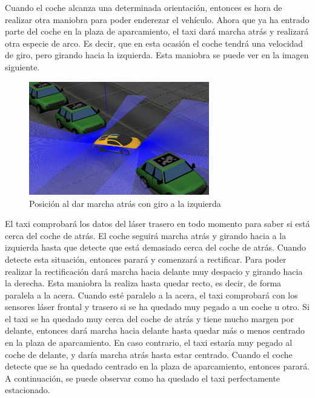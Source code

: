 Cuando el coche alcanza una determinada orientación, entonces es hora de realizar otra maniobra para poder enderezar el vehículo. Ahora que ya ha entrado parte del coche en la plaza de aparcamiento, el taxi dará marcha atrás y realizará otra especie de arco. Es decir, que en esta ocasión el coche tendrá una velocidad de giro, pero girando hacia la izquierda. Esta maniobra se puede ver en la imagen siguiente.\\

\begin{figure}[H]
  \begin{center}
    \includegraphics[width=0.7\textwidth]{figures/Autopark/Posicion4.png}
		\caption{Posición al dar marcha atrás con giro a la izquierda}
		\label{fig.Posicion4}
		\end{center}
\end{figure}

El taxi comprobará los datos del láser trasero en todo momento para saber si está cerca del coche de atrás. El coche seguirá marcha atrás y girando hacia a la izquierda hasta que detecte que está demasiado cerca del coche de atrás. Cuando detecte esta situación, entonces parará y comenzará a rectificar. Para poder realizar la rectificación dará marcha hacia delante muy despacio y girando hacia la derecha. Esta maniobra la realiza hasta quedar recto, es decir, de forma paralela a la acera. Cuando esté paralelo a la acera, el taxi comprobará con los sensores láser frontal y trasero si se ha quedado muy pegado a un coche u otro. Si el taxi se ha quedado muy cerca del coche de atrás y tiene mucho margen por delante, entonces dará marcha hacia delante hasta quedar más o menos centrado en la plaza de aparcamiento. En caso contrario, el taxi estaría muy pegado al coche de delante, y daría marcha atrás hasta estar centrado. Cuando el coche detecte que se ha quedado centrado en la plaza de aparcamiento, entonces parará. A continuación, se puede observar como ha quedado el taxi perfectamente estacionado.\\

